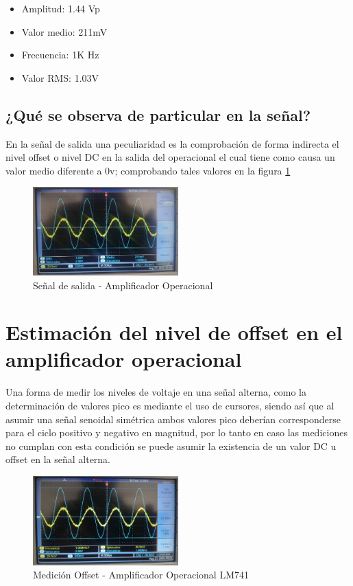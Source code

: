 \begin{itemize}
	\item Amplitud: 1.44 Vp
	\item Valor medio: 211mV
	\item Frecuencia: 1K Hz
	\item Valor RMS: 1.03V
\end{itemize}

\subsection{¿Qué se observa de particular en la señal?}
En la señal de salida una peculiaridad es la comprobación de forma indirecta el nivel offset o nivel DC en la salida del operacional el cual tiene como causa un valor medio diferente a 0v; comprobando tales valores en la figura \ref{fig:salida-operacional}

\begin{figure}[h]
	\centering
	\includegraphics[width=0.5\textwidth]{media/salida-operacional}
	\caption{Señal de salida - Amplificador Operacional}
	\label{fig:salida-operacional}
\end{figure}

\section{Estimación del nivel de offset en el amplificador operacional}

Una forma de medir los niveles de voltaje en una señal alterna, como la determinación de valores pico es mediante el uso de cursores, siendo así que al asumir una señal senoidal simétrica ambos valores pico deberían corresponderse para el ciclo positivo y negativo en magnitud, por lo tanto en caso las mediciones no cumplan con esta condición se puede asumir la existencia de un valor DC u offset en la señal alterna.

\begin{figure}[h]
	\centering
	\includegraphics[width=0.5\textwidth]{media/offset-741}
	\caption{Medición Offset - Amplificador Operacional LM741}
	\label{fig:offset-741}
\end{figure}

